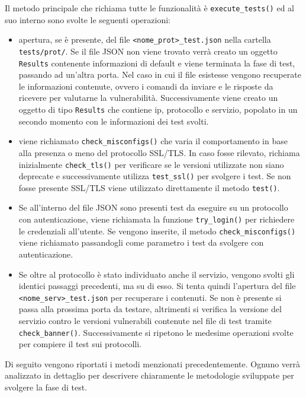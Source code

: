 \documentclass[12pt]{report}
\begin{document}
Il metodo principale che richiama tutte le funzionalità è \lstinline{execute_tests()} ed al suo interno sono svolte le seguenti operazioni:
\begin{itemize}
    \item apertura, se è presente, del file \lstinline{<nome_prot>_test.json} nella cartella \lstinline{tests/prot/}. Se il file JSON non viene trovato verrà creato un oggetto \lstinline{Results} contenente informazioni di default e viene terminata la fase di test, passando ad un'altra porta. Nel caso in cui il file esistesse vengono recuperate le informazioni contenute, ovvero i comandi da inviare e le risposte da ricevere per valutarne la vulnerabilità. Successivamente viene creato un oggetto di tipo \lstinline{Results} che contiene ip, protocollo e servizio, popolato in un secondo momento con le informazioni dei test svolti. 
    \item viene richiamato \lstinline{check_misconfigs()} che varia il comportamento in base alla presenza o meno del protocollo SSL/TLS. In caso fosse rilevato, richiama inizialmente \lstinline{check_tls()} per verificare se le versioni utilizzate non siano deprecate e successivamente utilizza \lstinline{test_ssl()} per svolgere i test. Se non fosse presente SSL/TLS viene utilizzato direttamente il metodo \lstinline{test()}.
    \item Se all'interno del file JSON sono presenti test da eseguire su un protocollo con autenticazione, viene richiamata la funzione \lstinline{try_login()} per richiedere le credenziali all'utente. Se vengono inserite, il metodo \lstinline{check_misconfigs()} viene richiamato passandogli come parametro i test da svolgere con autenticazione. 
    \item Se oltre al protocollo è stato individuato anche il servizio, vengono svolti gli identici passaggi precedenti, ma su di esso. Si tenta quindi l'apertura del file \lstinline{<nome_serv>_test.json} per recuperare i contenuti. Se non è presente si passa alla prossima porta da testare, altrimenti si verifica la versione del servizio contro le versioni vulnerabili contenute nel file di test tramite \lstinline{check_banner()}. Successivamente si ripetono le medesime operazioni svolte per compiere il test sui protocolli.
\end{itemize}

Di seguito vengono riportati i metodi menzionati precedentemente. Ognuno verrà analizzato in dettaglio per descrivere chiaramente le metodologie sviluppate per svolgere la fase di test.
\end{document}
